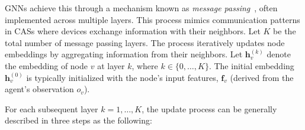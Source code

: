 \glspl{GNN} achieve this through a mechanism known as \emph{message passing}~\cite{DBLP:conf/icml/GilmerSRVD17}, 
 often implemented across multiple layers. 
%
This process mimics communication patterns in \glspl{CAS} 
 where devices exchange information with their neighbors.
%
Let \(K\) be the total number of message passing layers. 
% 
The process iteratively updates node embeddings 
 by aggregating information from their neighbors. 
% 
Let \(\mathbf{h}_v^{(k)}\) denote the embedding of node \(v\) at layer \(k\), 
 where \(k \in \{0, \dots, K\}\). 
% 
The initial embedding \(\mathbf{h}_v^{(0)}\) is typically initialized with the node's input features, 
 \(\mathbf{f}_v\) (derived from the agent's observation \(o_v\)).

For each subsequent layer \(k = 1, \dots, K\), 
 the update process can be generally described in three steps as the following:

